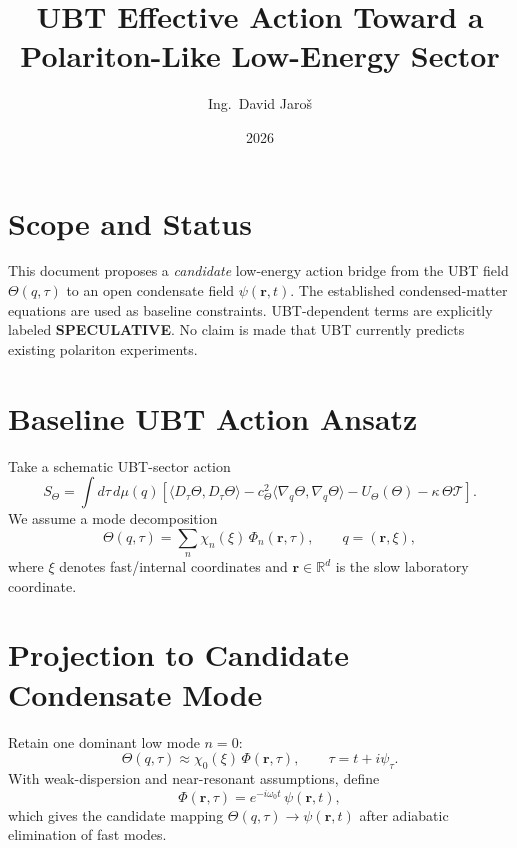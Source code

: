 \documentclass[11pt,a4paper]{article}
\title{UBT Effective Action Toward a Polariton-Like Low-Energy Sector}
\author{Ing.\ David Jaroš}
\date{2026}
\begin{document}
\maketitle

\section*{Scope and Status}
This document proposes a \emph{candidate} low-energy action bridge from the UBT field $\Theta(q,\tau)$ to an open condensate field $\psi(\mathbf r,t)$. The established condensed-matter equations are used as baseline constraints. UBT-dependent terms are explicitly labeled \textbf{SPECULATIVE}. No claim is made that UBT currently predicts existing polariton experiments.

\section{Baseline UBT Action Ansatz}
Take a schematic UBT-sector action
\begin{equation}
S_{\Theta}=\int d\tau\,d\mu(q)\left[\langle D_\tau\Theta,D_\tau\Theta\rangle-c_\Theta^2\langle\nabla_q\Theta,\nabla_q\Theta\rangle-U_\Theta(\Theta)-\kappa\,\Theta\mathcal T\right].
\end{equation}
We assume a mode decomposition
\begin{equation}
\Theta(q,\tau)=\sum_n \chi_n(\xi)\,\Phi_n(\mathbf r,\tau),\qquad q=(\mathbf r,\xi),
\end{equation}
where $\xi$ denotes fast/internal coordinates and $\mathbf r\in\mathbb R^d$ is the slow laboratory coordinate.

\section{Projection to Candidate Condensate Mode}
Retain one dominant low mode $n=0$:
\begin{equation}
\Theta(q,\tau)\approx \chi_0(\xi)\,\Phi(\mathbf r,\tau),\qquad \tau=t+i\psi_\tau.
\end{equation}
With weak-dispersion and near-resonant assumptions, define
\begin{equation}
\Phi(\mathbf r,\tau)=e^{-i\omega_0 t}\,\psi(\mathbf r,t),
\end{equation}
which gives the candidate mapping $\Theta(q,\tau)\to\psi(\mathbf r,t)$ after adiabatic elimination of fast modes.
\end{document}
